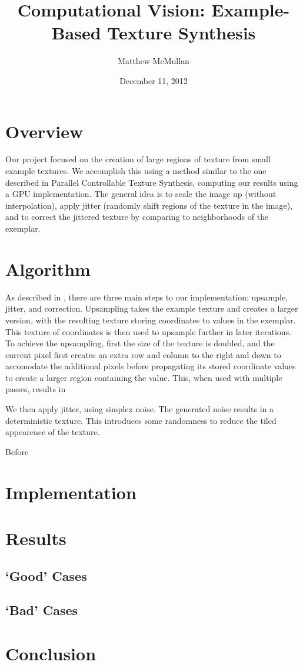 \documentclass[10pt, twocolumn]{article}
\title{Computational Vision: Example-Based Texture Synthesis}
\author{Matthew McMullan}
\date{December 11, 2012}
\begin{document}
    \maketitle
    \section{Overview}
        Our project focused on the creation of large regions of texture from small example textures.  We accomplish this using a method similar to the one described in Parallel Controllable Texture Synthesis, computing our results using a GPU implementation.  The general idea is to scale the image up (without interpolation), apply jitter (randomly shift regions of the texture in the image), and to correct the jittered texture by comparing to neighborhoods of the exemplar.
    \section{Algorithm}
        As described in \cite{paratext}, there are three main steps to our implementation: upsample, jitter, and correction.  Upsampling takes the example texture and creates a larger version, with the resulting texture storing coordinates to values in the exemplar.  This texture of coordinates is then used to upsample further in later iterations.  To achieve the upsampling, first the size of the texture is doubled, and the current pixel first creates an extra row and column to the right and down to accomodate the additional pixels before propagating its stored coordinate values to create a larger region containing the value.  This, when used with multiple passes, results in %

        We then apply jitter, using simplex noise.  The generated noise results in a deterministic texture.  This introduces some randomness to reduce the tiled appearence of the texture.

        Before 
    \section{Implementation}
    \section{Results}
        \subsection{`Good' Cases}
        \subsection{`Bad' Cases}
    \section{Conclusion}
    
    
    
\end{document}

